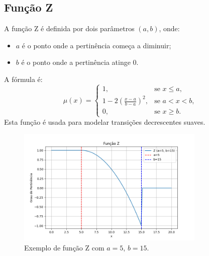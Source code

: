 \documentclass[a4paper,12pt]{article}
\begin{document}
\subsection{Função Z}
A função Z é definida por dois parâmetros $(a, b)$, onde:
\begin{itemize}
    \item $a$ é o ponto onde a pertinência começa a diminuir;
    \item $b$ é o ponto onde a pertinência atinge 0.
\end{itemize}
A fórmula é:
\[
\mu(x) =
\begin{cases}
1, & \text{se } x \leq a, \\
1 - 2\left(\frac{x - a}{b - a}\right)^2, & \text{se } a < x < b, \\
0, & \text{se } x \geq b.
\end{cases}
\]
Esta função é usada para modelar transições decrescentes suaves.
\begin{figure}[H]
    \centering
    \includegraphics[width=0.8\textwidth]{img/z.png}
    \caption{Exemplo de função Z com $a=5$, $b=15$.}
\end{figure}
\end{document}
